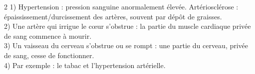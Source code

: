 \begin{multicols}{2}
1) Hypertension : pression sanguine anormalement élevée. Artériosclérose :
épaississement/durcissement des artères, souvent par dépôt de graisses.\\
2) Une artère qui irrigue le cœur s'obstrue : la partie du muscle cardiaque privée de
sang commence à mourir.\\
3) Un vaisseau du cerveau s'obstrue ou se rompt : une partie du cerveau, privée de
sang, cesse de fonctionner.\\
4) Par exemple : le tabac et l'hypertension artérielle.

\end{multicols}
\exercicesBanner
